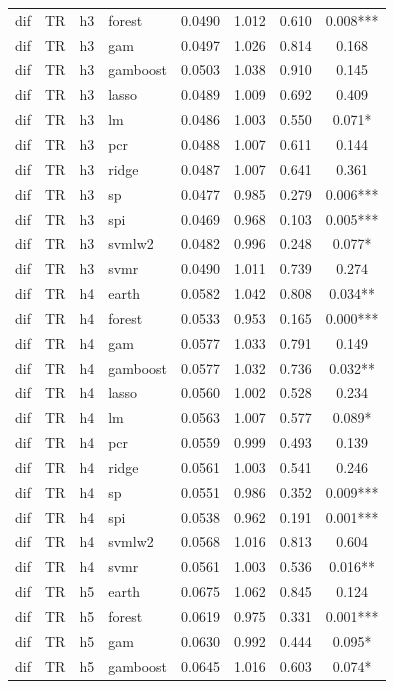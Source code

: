 \begin{ThreePartTable}
\begin{longtable}[t]{llclcccc}
dif & TR & h3 & forest & 0.0490 & 1.012 & 0.610 & 0.008***\\
dif & TR & h3 & gam & 0.0497 & 1.026 & 0.814 & 0.168\\
dif & TR & h3 & gamboost & 0.0503 & 1.038 & 0.910 & 0.145\\
dif & TR & h3 & lasso & 0.0489 & 1.009 & 0.692 & 0.409\\
dif & TR & h3 & lm & 0.0486 & 1.003 & 0.550 & 0.071*\\
dif & TR & h3 & pcr & 0.0488 & 1.007 & 0.611 & 0.144\\
dif & TR & h3 & ridge & 0.0487 & 1.007 & 0.641 & 0.361\\
dif & TR & h3 & sp & 0.0477 & 0.985 & 0.279 & 0.006***\\
dif & TR & h3 & spi & 0.0469 & 0.968 & 0.103 & 0.005***\\
dif & TR & h3 & svmlw2 & 0.0482 & 0.996 & 0.248 & 0.077*\\
dif & TR & h3 & svmr & 0.0490 & 1.011 & 0.739 & 0.274\\
\addlinespace
dif & TR & h4 & earth & 0.0582 & 1.042 & 0.808 & 0.034**\\
dif & TR & h4 & forest & 0.0533 & 0.953 & 0.165 & 0.000***\\
dif & TR & h4 & gam & 0.0577 & 1.033 & 0.791 & 0.149\\
dif & TR & h4 & gamboost & 0.0577 & 1.032 & 0.736 & 0.032**\\
dif & TR & h4 & lasso & 0.0560 & 1.002 & 0.528 & 0.234\\
dif & TR & h4 & lm & 0.0563 & 1.007 & 0.577 & 0.089*\\
dif & TR & h4 & pcr & 0.0559 & 0.999 & 0.493 & 0.139\\
dif & TR & h4 & ridge & 0.0561 & 1.003 & 0.541 & 0.246\\
dif & TR & h4 & sp & 0.0551 & 0.986 & 0.352 & 0.009***\\
dif & TR & h4 & spi & 0.0538 & 0.962 & 0.191 & 0.001***\\
dif & TR & h4 & svmlw2 & 0.0568 & 1.016 & 0.813 & 0.604\\
dif & TR & h4 & svmr & 0.0561 & 1.003 & 0.536 & 0.016**\\
\addlinespace
dif & TR & h5 & earth & 0.0675 & 1.062 & 0.845 & 0.124\\
dif & TR & h5 & forest & 0.0619 & 0.975 & 0.331 & 0.001***\\
dif & TR & h5 & gam & 0.0630 & 0.992 & 0.444 & 0.095*\\
dif & TR & h5 & gamboost & 0.0645 & 1.016 & 0.603 & 0.074*\\

\end{longtable}
\end{ThreePartTable}
